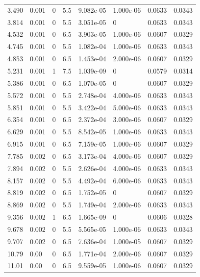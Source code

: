 \documentclass[preview]{standalone}
\begin{document}
{{\begin{tabular}{L{1.2cm}C{1.2cm} C{0.3cm}C{0.5cm} C{1.4cm}C{1.4cm} C{1.4cm}C{1.4cm}}
  3.490  &  0.001  & 0     & 5.5 &  9.082e-05  & 1.000e-06  & 0.0633 &  0.0343   \\ 
  3.814  &  0.001  & 0     & 5.5 &  3.051e-05  & 0  & 0.0633 &  0.0343   \\ 
  4.532  &  0.001  & 0     & 6.5 &  3.903e-05  & 1.000e-06  & 0.0607 &  0.0329   \\ 
  4.745  &  0.001  & 0     & 5.5 &  1.082e-04  & 1.000e-06  & 0.0633 &  0.0343   \\ 
  4.853  &  0.001  & 0     & 6.5 &  1.453e-04  & 2.000e-06  & 0.0607 &  0.0329   \\ 
  5.231  &  0.001  & 1     & 7.5 &  1.039e-09  & 0  & 0.0579 &  0.0314   \\ 
  5.386  &  0.001  & 0     & 6.5 &  1.070e-05  & 0  & 0.0607 &  0.0329   \\ 
  5.572  &  0.001  & 0     & 5.5 &  2.748e-04  & 4.000e-06  & 0.0633 &  0.0343   \\ 
  5.851  &  0.001  & 0     & 5.5 &  3.422e-04  & 5.000e-06  & 0.0633 &  0.0343   \\ 
  6.354  &  0.001  & 0     & 6.5 &  2.372e-04  & 3.000e-06  & 0.0607 &  0.0329   \\ 
  6.629  &  0.001  & 0     & 5.5 &  8.542e-05  & 1.000e-06  & 0.0633 &  0.0343   \\ 
  6.915  &  0.001  & 0     & 6.5 &  7.159e-05  & 1.000e-06  & 0.0607 &  0.0329   \\ 
  7.785  &  0.002  & 0     & 6.5 &  3.173e-04  & 4.000e-06  & 0.0607 &  0.0329   \\ 
  7.894  &  0.002  & 0     & 5.5 &  2.626e-04  & 4.000e-06  & 0.0633 &  0.0343   \\ 
  8.157  &  0.002  & 0     & 5.5 &  4.492e-04  & 6.000e-06  & 0.0633 &  0.0343   \\ 
  8.819  &  0.002  & 0     & 6.5 &  1.752e-05  & 0  & 0.0607 &  0.0329   \\ 
  8.869  &  0.002  & 0     & 5.5 &  1.749e-04  & 2.000e-06  & 0.0633 &  0.0343   \\ 
  9.356  &  0.002  & 1     & 6.5 &  1.665e-09  & 0  & 0.0606 &  0.0328   \\ 
  9.678  &  0.002  & 0     & 5.5 &  5.565e-05  & 1.000e-06  & 0.0633 &  0.0343   \\ 
  9.707  &  0.002  & 0     & 6.5 &  7.636e-04  & 1.000e-05  & 0.0607 &  0.0329   \\ 
  10.79  &  0.00  & 0     & 6.5 &  1.771e-04  & 2.000e-06  & 0.0607 &  0.0329   \\ 
  11.01  &  0.00  & 0     & 6.5 &  9.559e-05  & 1.000e-06  & 0.0607 &  0.0329   \\ 

\end{tabular}}}
\end{document}
